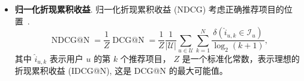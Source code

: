 \begin{itemize}
    \item \textbf{归一化折现累积收益}. 归一化折现累积收益 (NDCG) 考虑正确推荐项目的位置~\cite{jarvelin2000ir}.
        \begin{equation}
            \operatorname{NDCG@N} = \frac{1}{Z}\operatorname{DCG@N} = \frac{1}{Z} \frac{1}{|\mathcal{U}|}\sum_{u\in\mathcal{U}}\sum_{k=1}^{N}\frac{\delta(\hat{i}_{u,k}\in \mathcal{I}_{u})}{\operatorname{log}_2(k+1)},
        \end{equation}
        其中 $\hat{i}_{u,k}$ 表示用户 $u$ 的第 $k$ 个推荐项目， $Z$ 是一个标准化常数，表示理想的折现累积收益 (IDCG@N), 这是 DCG@N 的最大可能值。 
\end{itemize}



